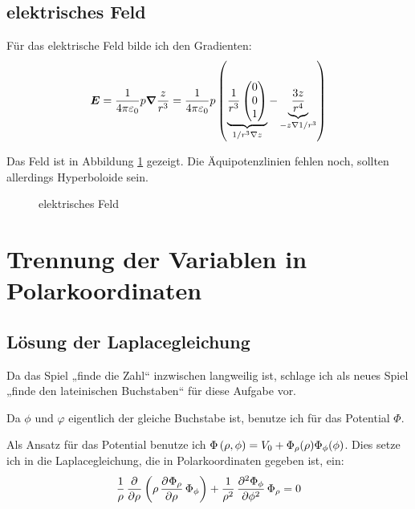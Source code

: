 \documentclass[11pt, ngerman, fleqn]{article}
\newcommand{\vnabla}{\vec \nabla}
\renewcommand{\vec}[1]{\boldsymbol{#1}}
\begin{document}
\subsection{elektrisches Feld}

Für das elektrische Feld bilde ich den Gradienten:
\[
	\vec E
	= \frac{1}{4 \pi \varepsilon_0} p \vnabla \frac{z}{r^3}
	= \frac{1}{4 \pi \varepsilon_0} p \del{ \underbrace{\frac{1}{r^3} \begin{pmatrix}
		0 \\ 0 \\ 1
\end{pmatrix}}_{1/r^3 \nabla z} - \underbrace{\frac{3z}{r^4}}_{-z \nabla 1/r^3} }
\]

Das Feld ist in Abbildung \ref{plot} gezeigt. Die Äquipotenzlinien fehlen noch, sollten allerdings Hyperboloide sein.

\begin{figure}[ht]
	\centering
	\caption{elektrisches Feld}
	\label{plot}
\end{figure}


\section{Trennung der Variablen in Polarkoordinaten}

\subsection{Lösung der Laplacegleichung}

\begin{footnotesize}
	Da das Spiel „finde die Zahl“ inzwischen langweilig ist, schlage ich als
	neues Spiel „finde den lateinischen Buchstaben“ für diese Aufgabe vor.
\end{footnotesize}

Da $\phi$ und $\varphi$ eigentlich der gleiche Buchstabe ist, benutze ich für
das Potential $\Phi$.

Als Ansatz für das Potential benutze ich $\Phi\del{\rho, \phi} = V_0 +
\Phi_\rho(\rho) \Phi_\phi(\phi)$. Dies setze ich in die Laplacegleichung, die
in Polarkoordinaten gegeben ist, ein:
\[
	\frac 1\rho \dpd{}\rho \del{\rho \dpd{\Phi_\rho}\rho \Phi_\phi} + \frac
	1{\rho^2} \dpd[2]{\Phi_\phi}\phi \Phi_\rho = 0
\]
\end{document}
